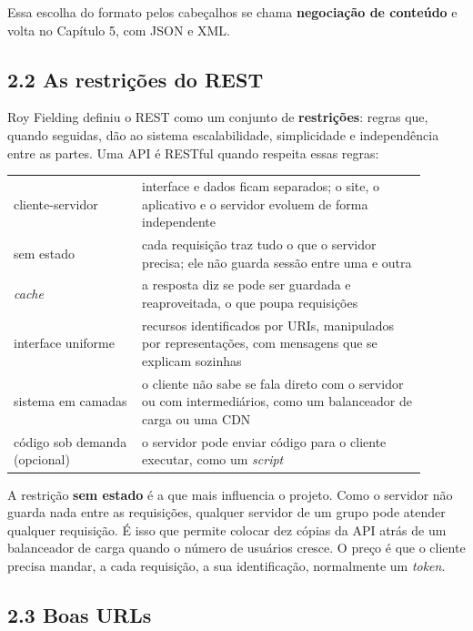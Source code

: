 Essa escolha do formato pelos cabeçalhos se chama \textbf{negociação de conteúdo} e volta no Capítulo 5, com JSON e XML.

\subsection{2.2 As restrições do REST}

Roy Fielding definiu o REST como um conjunto de \textbf{restrições}: regras que, quando seguidas, dão ao sistema escalabilidade, simplicidade e independência entre as partes. Uma API é RESTful quando respeita essas regras:

\begin{center}
\begin{tabular}{@{}P{0.28\linewidth}P{0.62\linewidth}@{}}
\toprule
{}
 &  \\
\midrule
cliente-servidor & interface e dados ficam separados; o site, o aplicativo e o servidor evoluem de forma independente \\
 sem estado & cada requisição traz tudo o que o servidor precisa; ele não guarda sessão entre uma e outra \\
\textit{cache} & a resposta diz se pode ser guardada e reaproveitada, o que poupa requisições \\
 interface uniforme & recursos identificados por URIs, manipulados por representações, com mensagens que se explicam sozinhas \\
sistema em camadas & o cliente não sabe se fala direto com o servidor ou com intermediários, como um balanceador de carga ou uma CDN \\
 código sob demanda (opcional) & o servidor pode enviar código para o cliente executar, como um \textit{script} \\
\bottomrule
\end{tabular}
\end{center}

A restrição \textbf{sem estado} é a que mais influencia o projeto. Como o servidor não guarda nada entre as requisições, qualquer servidor de um grupo pode atender qualquer requisição. É isso que permite colocar dez cópias da API atrás de um balanceador de carga quando o número de usuários cresce. O preço é que o cliente precisa mandar, a cada requisição, a sua identificação, normalmente um \textit{token}.

\subsection{2.3 Boas URLs}

